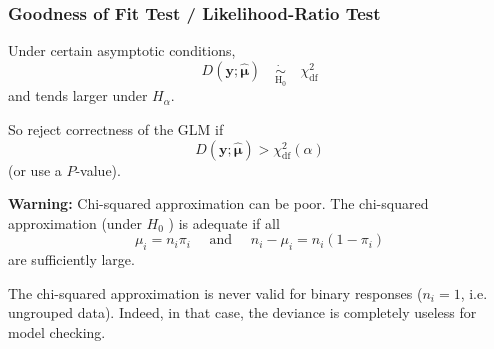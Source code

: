 \documentclass[11pt]{elegantbook}
\begin{document}
\subsubsection{Goodness of Fit Test / Likelihood-Ratio Test}
Under certain asymptotic conditions,
$$
D(\boldsymbol{y} ; \hat{\boldsymbol{\mu}})\quad \underset{\mathrm{H}_0}{\dot{\sim}} \quad \chi_{\mathrm{df}}^2
$$
and tends larger under $H_\alpha$.

So reject correctness of the GLM if
$$
D(\boldsymbol{y} ; \hat{\boldsymbol{\mu}})>\chi_{\mathrm{df}}^2(\alpha)
$$
(or use a $P$-value).

\textbf{Warning:} Chi-squared approximation can be poor. The chi-squared approximation (under $H_0$ ) is adequate if all
$$
\mu_i=n_i \pi_i \quad \text { and } \quad n_i-\mu_i=n_i\left(1-\pi_i\right)
$$
are sufficiently large.

The chi-squared approximation is never valid for binary responses ($n_i=1$, i.e. ungrouped data). Indeed, in that case, the deviance is completely useless for model checking.
\end{document}
